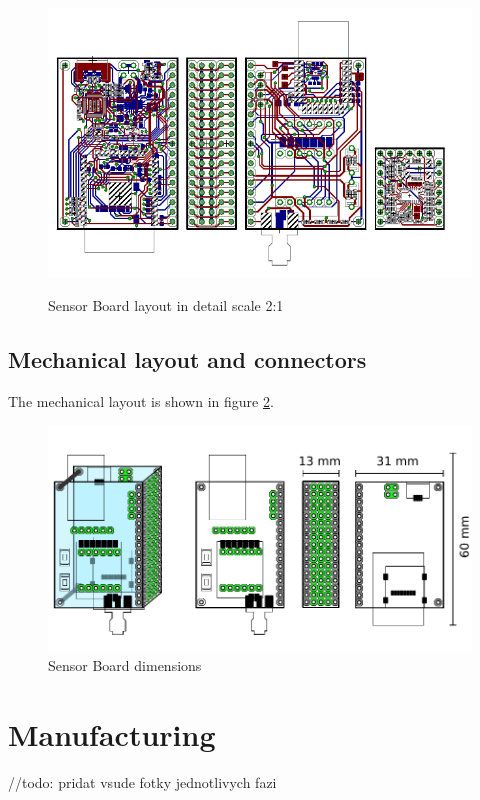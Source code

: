 \begin{figure}[H]
	\centering
	\includegraphics[angle=90, scale=2]{img/brd.pdf}
	\label{brd2}
	\caption{Sensor Board layout in detail scale 2:1}
\end{figure}

\subsection{Mechanical layout and connectors}
The mechanical layout is shown in figure \ref{fig:HWdimensions}.

\begin{figure}[H]
	\centering
	\label{fig:HWdimensions}
	\caption{Sensor Board dimensions}
	\includegraphics[scale=1]{img/HWdimensions.pdf}
\end{figure}

\section{Manufacturing}
\label{HWmanufacturing}
//todo: pridat vsude fotky jednotlivych fazi


